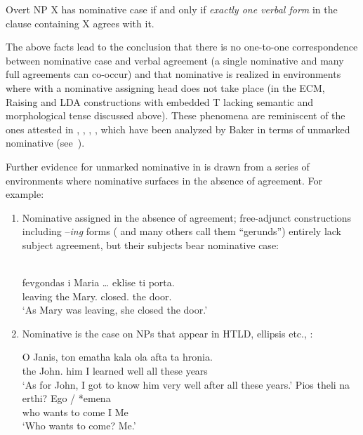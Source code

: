 \documentclass[output=paper]{langsci/langscibook}
\begin{document}
\begin{exe}
    \exi{\eqref{ex:13.1}}
    Overt NP X has nominative case if and only if \emph{exactly one verbal
    form} in the clause containing X agrees with it.
\z

The above facts lead to the conclusion that there is no one-to-one
correspondence between nominative case and verbal agreement
(a single nominative and many full agreements can co-occur) and that
nominative is realized in environments where 
with a nominative assigning head does not take place (in
the \gls{ECM}, Raising
and \gls{LDA} constructions with embedded T lacking semantic and morphological
tense discussed above). These phenomena are reminiscent of the ones attested in
, , , , which have been
analyzed by Baker in terms of unmarked nominative
(see~).

Further evidence for unmarked nominative in  is
drawn from a series of environments where nominative
surfaces in the absence of agreement. For example:

\begin{enumerate}
\item Nominative assigned in the absence of agreement;  free-adjunct
constructions including –\emph{ing} forms (\citealt{Tsimpli2000} and many
others call them \enquote{gerunds}) entirely lack subject agreement, but their
subjects bear nominative case:

\ea%
    \label{ex:13.30}\\
    \gll  fevgondas i Maria \dots{}     eklise ti porta.\\
            leaving the Mary.\Nom{} {}  closed.\Tsg{} the door.\Acc{}\\
    \glt  ‘As Mary was leaving, she closed the door.’
\z

\item Nominative is the case on NPs that appear in HTLD, ellipsis etc.,
\citet{Schutze2001}:

\ea%
    \label{ex:13.31}
	\ea
	\gll  O Janis, ton ematha kala ola afta ta hronia.\\
	    the John.\Nom{} him I learned well all these years\\
	\glt     ‘As for John, I got to know him very well after all these years.’
    \ex
	\gll  Pios theli na erthi?  Ego / *emena\\
            who wants to come  I {} \hphantom{*}Me\\
	\glt     ‘Who wants to come? Me.’
    \z
\z
\end{enumerate}


\end{exe}
\end{document}
